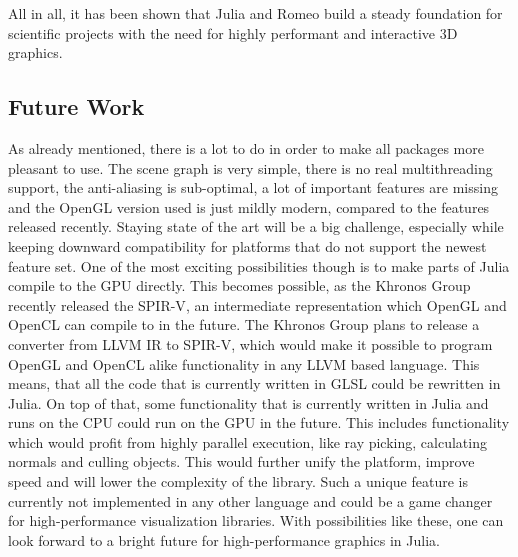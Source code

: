 All in all, it has been shown that Julia and Romeo build a steady foundation for scientific projects with the need for highly performant and interactive 3D graphics.

\subsection{Future Work}

As already mentioned, there is a lot to do in order to make all packages more pleasant to use.
The scene graph is very simple, there is no real multithreading support, the anti-aliasing is sub-optimal, a lot of important features are missing and the OpenGL version used is just mildly modern, compared to the features released recently. 
Staying state of the art will be a big challenge, especially while keeping downward compatibility for platforms that do not support the newest feature set.
One of the most exciting possibilities though is to make parts of Julia compile to the GPU directly. 
This becomes possible, as the Khronos Group recently released the \ac{SPIR-V}, an intermediate representation which \ac{OpenGL} and \ac{OpenCL} can compile to in the future. The Khronos Group plans to release a converter from \ac{LLVM} \ac{IR} to \ac{SPIR-V}, which would make it possible to program \ac{OpenGL} and \ac{OpenCL} alike functionality in any \ac{LLVM} based language\cite{SpirV}.
This means, that all the code that is currently written in \ac{GLSL} could be rewritten in Julia. 
On top of that, some functionality that is currently written in Julia and runs on the \ac{CPU} could run on the \ac{GPU} in the future. This includes functionality which would profit from highly parallel execution, like ray picking, calculating normals and culling objects.
This would further unify the platform, improve speed and will lower the complexity of the library. 
Such a unique feature is currently not implemented in any other language and could be a game changer for high-performance visualization libraries.
With possibilities like these, one can look forward to a bright future for high-performance graphics in Julia.

